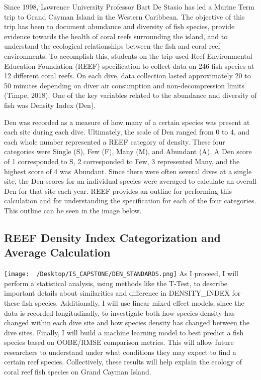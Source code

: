\documentclass[
]{article}
\begin{document}
Since 1998, Lawrence University Professor Bart De Stasio has led a
Marine Term trip to Grand Cayman Island in the Western Caribbean. The
objective of this trip has been to document abundance and diversity of
fish species, provide evidence towards the health of coral reefs
surrounding the island, and to understand the ecological relationships
between the fish and coral reef environments. To accomplish this,
students on the trip used Reef Environmental Education Foundation (REEF)
specification to collect data on 246 fish species at 12 different coral
reefs. On each dive, data collection lasted approximately 20 to 50
minutes depending on diver air consumption and non-decompression limits
(Timpe, 2018). One of the key variables related to the abundance and
diversity of fish was Density Index (Den).

Den was recorded as a measure of how many of a certain species was
present at each site during each dive. Ultimately, the scale of Den
ranged from 0 to 4, and each whole number represented a REEF category of
density. These four categories were Single (S), Few (F), Many (M), and
Abundant (A). A Den score of 1 corresponded to S, 2 corresponded to Few,
3 represented Many, and the highest score of 4 was Abundant. Since there
were often several dives at a single site, the Den scores for an
individual species were averaged to calculate an overall Den for that
site each year. REEF provides an outline for performing this calculation
and for understanding the specification for each of the four categories.
This outline can be seen in the image below.

\hypertarget{reef-density-index-categorization-and-average-calculation}{%
\subsection{REEF Density Index Categorization and Average
Calculation}\label{reef-density-index-categorization-and-average-calculation}}

\texttt{[image: ~/Desktop/IS\_CAPSTONE/DEN\_STANDARDS.png]} As I proceed,
I will perform a statistical analysis, using methods like the T-Test, to
describe important details about similarities and difference in
DENSITY\_INDEX for these fish species. Additionally, I will use linear
mixed effect models, since the data is recorded longitudinally, to
investigate both how species density has changed within each dive site
and how species density has changed between the dive sites. Finally, I
will build a machine learning model to best predict a fish species based
on OOBE/RMSE comparison metrics. This will allow future researchers to
understand under what conditions they may expect to find a certain reef
species. Collectively, these results will help explain the ecology of
coral reef fish species on Grand Cayman Island.
\end{document}
